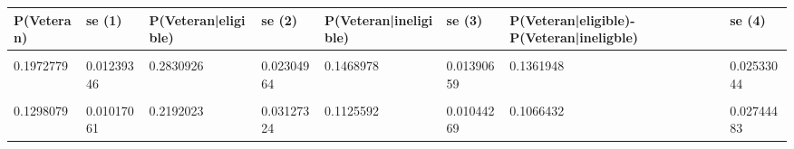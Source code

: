 \documentclass[]{article}
\begin{document}
\begin{adjustbox}{width=\textwidth}

\begin{tabular}[t]{llllllll}\hline

P(Veteran) & se (1) & P(Veteran|eligible) & se (2) & P(Veteran|ineligible) & se (3) & P(Veteran|eligible)-P(Veteran|ineligble) & se (4)\\ \hline

\cellcolor{gray!6}{0.2673053} & \cellcolor{gray!6}{0.01358010} & \cellcolor{gray!6}{0.3527159} & \cellcolor{gray!6}{0.02154157} & \cellcolor{gray!6}{0.1933552} & \cellcolor{gray!6}{0.01655629} & \cellcolor{gray!6}{0.1593607} & \cellcolor{gray!6}{0.02680065}\\
0.1972779 & 0.01239346 & 0.2830926 & 0.02304964 & 0.1468978 & 0.01390659 & 0.1361948 & 0.02533044\\
\cellcolor{gray!6}{0.1553530} & \cellcolor{gray!6}{0.01107921} & \cellcolor{gray!6}{0.2310217} & \cellcolor{gray!6}{0.02449839} & \cellcolor{gray!6}{0.1257396} & \cellcolor{gray!6}{0.01193295} & \cellcolor{gray!6}{0.1052822} & \cellcolor{gray!6}{0.02444127}\\
0.1298079 & 0.01017061 & 0.2192023 & 0.03127324 & 0.1125592 & 0.01044269 & 0.1066432 & 0.02744483\\
\hline
\end{tabular}

\end{adjustbox}
\end{document}
